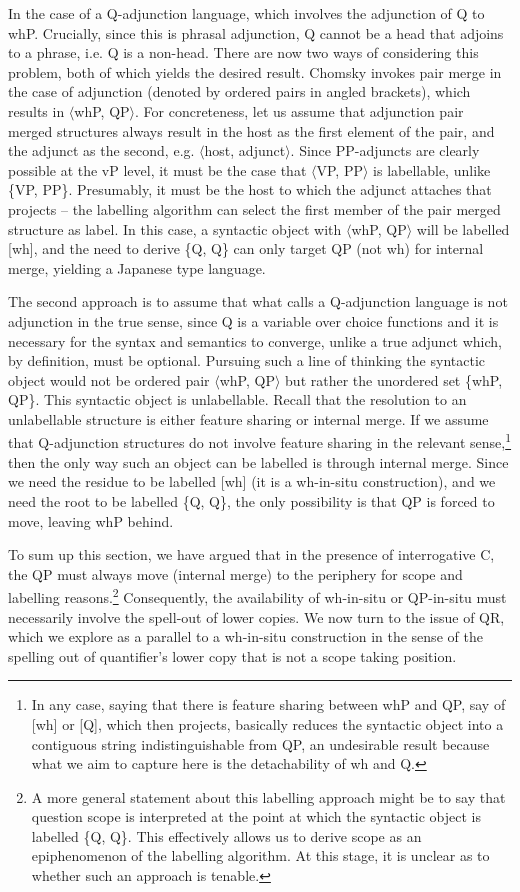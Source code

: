 \documentclass[11pt]{article}
\begin{document}
In the case of a Q-adjunction language, which involves the adjunction of Q to whP. Crucially, since this is phrasal adjunction, Q cannot be a head that adjoins to a phrase, i.e. Q is a non-head. There are now two ways of considering this problem, both of which yields the desired result. Chomsky invokes pair merge in the case of adjunction (denoted by ordered pairs in angled brackets), which results in $\langle$whP, QP$\rangle$. For concreteness, let us assume that adjunction pair merged structures always result in the host as the first element of the pair, and the adjunct as the second, e.g. $\langle$host, adjunct$\rangle$. Since PP-adjuncts are clearly possible at the vP level, it must be the case that $\langle$VP, PP$\rangle$ is labellable, unlike \{VP, PP\}. Presumably, it must be the host to which the adjunct attaches that projects -- the labelling algorithm can select the first member of the pair merged structure as label. In this case, a syntactic object with $\langle$whP, QP$\rangle$ will be labelled [wh], and the need to derive \{Q, Q\} can only target QP (not wh) for internal merge, yielding a Japanese type language.

The second approach is to assume that what \cite{cable:2007} calls a Q-adjunction language is not adjunction in the true sense, since Q is a variable over choice functions and it is necessary for the syntax and semantics to converge, unlike a true adjunct which, by definition, must be optional. Pursuing such a line of thinking the syntactic object would not be ordered pair $\langle$whP, QP$\rangle$ but rather the unordered set \{whP, QP\}. This syntactic object is unlabellable. Recall that the resolution to an unlabellable structure is either feature sharing or internal merge. If we assume that Q-adjunction structures do not involve feature sharing in the relevant sense,\footnote{In any case, saying that there is feature sharing between whP and QP, say of [wh] or [Q], which then projects, basically reduces the syntactic object into a contiguous string indistinguishable from QP, an undesirable result because what we aim to capture here is the detachability of wh and Q.} then the only way such an object can be labelled is through internal merge. Since we need the residue to be labelled [wh] (it is a wh-in-situ construction), and we need the root to be labelled \{Q, Q\}, the only possibility is that QP is forced to move, leaving whP behind.

To sum up this section, we have argued that in the presence of interrogative C, the QP must always move (internal merge) to the periphery for scope and labelling reasons.\footnote{A more general statement about this labelling approach might be to say that question scope is interpreted at the point at which the syntactic object is labelled \{Q, Q\}. This effectively allows us to derive scope as an epiphenomenon of the labelling algorithm. At this stage, it is unclear as to whether such an approach is tenable.} Consequently, the availability of wh-in-situ or QP-in-situ must necessarily involve the spell-out of lower copies. We now turn to the issue of QR, which we explore as a parallel to a wh-in-situ construction in the sense of the spelling out of quantifier's lower copy that is not a scope taking position.
\end{document}
